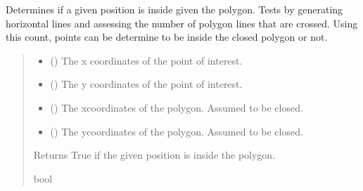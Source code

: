 \documentclass[letterpaper,10pt,english]{sphinxmanual}
\begin{document}

\begin{fulllineitems}
\label{\detokenize{modules/gps/zones:qnav.gps.zones.is_inside_polygon_vec}}
\pysigstartsignatures
{}
\pysigstopsignatures
\sphinxAtStartPar
Determines if a given position is inside given the polygon.
Tests by generating horizontal lines and assessing the number of
polygon lines that are crossed. Using this count, points can be
determine to be inside the closed polygon or not.
\begin{quote}\begin{description}
\begin{itemize}
\item {} 
\sphinxAtStartPar
{} () \textendash{} The x coordinates of the point of interest.

\item {} 
\sphinxAtStartPar
{} () \textendash{} The y coordinates of the point of interest.

\item {} 
\sphinxAtStartPar
{} () \textendash{} The x\sphinxhyphen{}coordinates of the polygon. Assumed to be closed.

\item {} 
\sphinxAtStartPar
{} () \textendash{} The y\sphinxhyphen{}coordinates of the polygon. Assumed to be closed.

\end{itemize}

\sphinxAtStartPar
Returns True if the given position is inside the polygon.

\sphinxAtStartPar
bool

\end{description}\end{quote}

\end{fulllineitems}
\end{document}
